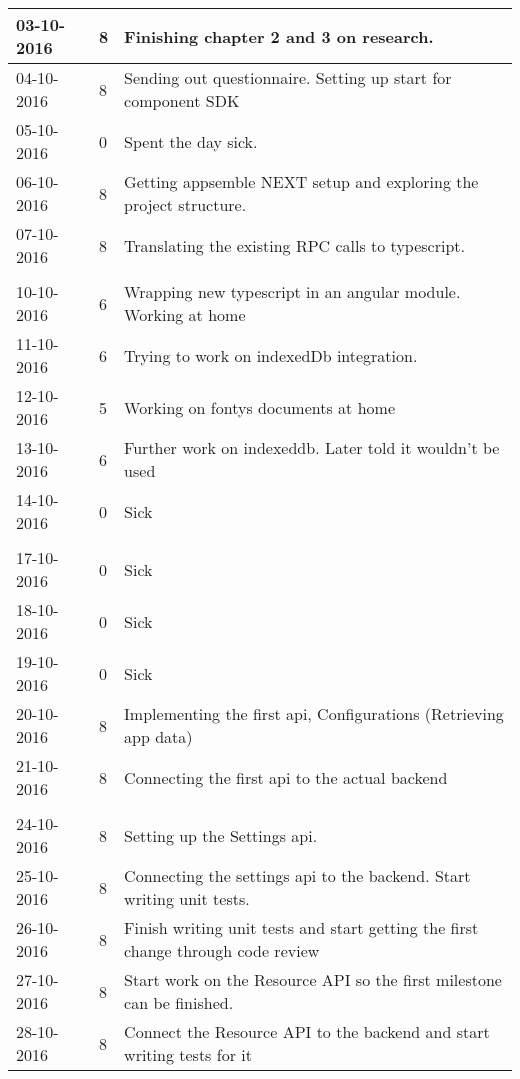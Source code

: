 \begin{tabular}{|p{2cm}|p{1cm}|p{10cm}|}
	\hline
	03-10-2016 & 8 & Finishing chapter 2 and 3 on research. \\ \hline
	04-10-2016 & 8 & Sending out questionnaire. Setting up start for component SDK \\ \hline
	05-10-2016 & 0 & Spent the day sick. \\ \hline
	06-10-2016 & 8 & Getting appsemble NEXT setup and exploring the project structure. \\ \hline
	07-10-2016 & 8 & Translating the existing RPC calls to typescript. \\ \hline
	
	\\ \hline
	
	10-10-2016 & 6 & Wrapping new typescript in an angular module. Working at home \\ \hline
	11-10-2016 & 6 & Trying to work on indexedDb integration. \\ \hline
	12-10-2016 & 5 & Working on fontys documents at home \\ \hline
	13-10-2016 & 6 & Further work on indexeddb. Later told it wouldn't be used \\ \hline
	14-10-2016 & 0 & Sick \\ \hline
	
	\\ \hline
	
	17-10-2016 & 0 & Sick \\ \hline
	18-10-2016 & 0 & Sick \\ \hline
	19-10-2016 & 0 & Sick \\ \hline
	20-10-2016 & 8 & Implementing the first api, Configurations (Retrieving app data) \\ \hline
	21-10-2016 & 8 & Connecting the first api to the actual backend \\ \hline
	
	\\ \hline
	
	24-10-2016 & 8 & Setting up the Settings api. \\ \hline
	25-10-2016 & 8 & Connecting the settings api to the backend. Start writing unit tests. \\ \hline
	26-10-2016 & 8 & Finish writing unit tests and start getting the first change through code review \\ \hline
	27-10-2016 & 8 & Start work on the Resource API so the first milestone can be finished. \\ \hline
	28-10-2016 & 8 & Connect the Resource API to the backend and start writing tests for it \\ \hline
	

\end{tabular}

